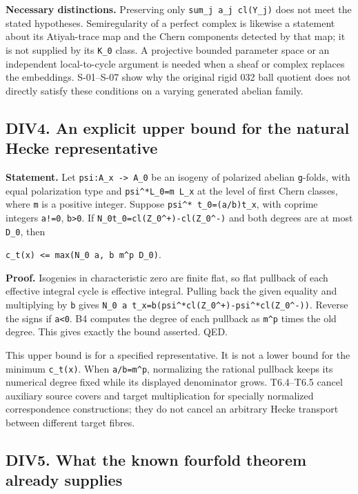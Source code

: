 \documentclass[11pt,a4paper]{article}
\theoremstyle{definition}
\begin{document}
\textbf{Necessary distinctions.} Preserving only
\texttt{sum\_j\ a\_j\ cl(Y\_j)} does not meet the stated hypotheses.
Semiregularity of a perfect complex is likewise a statement about its
Atiyah-trace map and the Chern components detected by that map; it is
not supplied by its \texttt{K\_0} class. A projective bounded parameter
space or an independent local-to-cycle argument is needed when a sheaf
or complex replaces the embeddings. S-01--S-07 show why the original
rigid 032 ball quotient does not directly satisfy these conditions on a
varying generated abelian family.

\subsection{DIV4. An explicit upper bound for the natural Hecke
representative}\label{div4.-an-explicit-upper-bound-for-the-natural-hecke-representative}

\textbf{Statement.} Let \texttt{psi:A\_x\ -\textgreater{}\ A\_0} be an
isogeny of polarized abelian \texttt{g}-folds, with equal polarization
type and \texttt{psi\^{}*L\_0=m\ L\_x} at the level of first Chern
classes, where \texttt{m} is a positive integer. Suppose
\texttt{psi\^{}*\ t\_0=(a/b)t\_x}, with coprime integers \texttt{a!=0},
\texttt{b\textgreater{}0}. If
\texttt{N\_0t\_0=cl(Z\_0\^{}+)-cl(Z\_0\^{}-)} and both degrees are at
most \texttt{D\_0}, then

\texttt{c\_t(x)\ \textless{}=\ max(N\_0\ \textbar{}a\textbar{},\ b\ m\^{}p\ D\_0)}.

\textbf{Proof.} Isogenies in characteristic zero are finite flat, so
flat pullback of each effective integral cycle is effective integral.
Pulling back the given equality and multiplying by \texttt{b} gives
\texttt{N\_0\ a\ t\_x=b(psi\^{}*cl(Z\_0\^{}+)-psi\^{}*cl(Z\_0\^{}-))}.
Reverse the signs if \texttt{a\textless{}0}. B4 computes the degree of
each pullback as \texttt{m\^{}p} times the old degree. This gives
exactly the bound asserted. QED.

This upper bound is for a specified representative. It is not a lower
bound for the minimum \texttt{c\_t(x)}. When \texttt{a/b=m\^{}p},
normalizing the rational pullback keeps its numerical degree fixed while
its displayed denominator grows. T6.4--T6.5 cancel auxiliary source
covers and target multiplication for specially normalized correspondence
constructions; they do not cancel an arbitrary Hecke transport between
different target fibres.

\subsection{DIV5. What the known fourfold theorem already
supplies}\label{div5.-what-the-known-fourfold-theorem-already-supplies}
\end{document}
